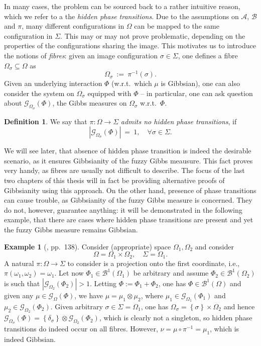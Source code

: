 \documentclass[12pt]{article}
\newcommand{\A}{\mathcal{A}}
\newcommand{\B}{\mathcal{B}}
\newcommand{\BB}{\mathscr{B}}
\newcommand{\G}{\mathcal{G}}
\newcommand{\set}[1]{\left\{#1\right\}}
\newcommand{\ra}{\rightarrow}
\newcommand{\1}{\mathbbm{1}}
\newcommand{\5}{\vspace{0.5cm}}
\theoremstyle{definition}
\newtheorem{ex}[thm]{Example}
\newtheorem{df}[thm]{Definition}
\begin{document}
In many cases, the problem can be sourced back to a rather intuitive reason, which we refer to a the \textit{hidden phase transitions}. Due to the assumptions on $\A$, $\B$ and $\pi$, many different configurations in $\Omega$ can be mapped to the same configuration in $\Sigma$. This may or may not prove problematic, depending on the properties of the configurations sharing the image. This motivates us to introduce the notions of \textit{fibres}: given an image configuration $\sigma\in\Sigma$, one defines a fibre $\Omega_\sigma\subseteq\Omega$ as
$$\Omega_\sigma ~:=~ \pi^{-1}(\sigma).$$
Given an underlying interaction $\Phi$ (w.r.t.~which $\mu$ is Gibbsian), one can also consider the system on $\Omega_\sigma$ equipped with $\Phi$ -- in particular, one can ask question about $\G_{\Omega_\sigma}(\Phi)$, the Gibbs measures on $\Omega_\sigma$ w.r.t.~$\Phi$. 
\begin{df}
We say that $\pi:\Omega\ra\Sigma$ \textit{admits no hidden phase transitions}, if 
$$|\G_{\Omega_\sigma}(\Phi)| ~=~ 1, \quad \forall \sigma\in\Sigma.$$
\end{df}
We will see later, that absence of hidden phase transition is indeed the desirable scenario, as it ensures Gibbsianity of the fuzzy Gibbs meausure. This fact proves very handy, as fibres are usually not difficult to describe. The focus of the last two chapters of this thesis will in fact be providing alternative proofs of Gibbsianity using this approach. On the other hand, presence of phase transitions can cause trouble, as Gibbsianity of the fuzzy Gibbs measure is concerned. They do not, however, guarantee anything: it will be demonstrated in the following example, that there are cases where hidden phase transitions are present and yet the fuzzy Gibbs measure remains Gibbsian.

\begin{ex}[\cite{Ber}, pp.~138]
Consider (appropriate) space $\Omega_1,\Omega_2$ and consider
$$\Omega=\Omega_1\times\Omega_2,\quad\Sigma=\Omega_1.$$
A natural $\pi:\Omega\ra\Sigma$ to consider is a projection onto the first coordinate, i.e., $\pi(\omega_1,\omega_2)=\omega_1$. Let now $\Phi_1\in\BB^1(\Omega_1)$ be arbitrary and assume $\Phi_2\in\BB^1(\Omega_2)$ is such that $|\G_{\Omega_2}(\Phi_2)|>1$. Letting $\Phi:=\Phi_1+\Phi_2$, one has $\Phi\in\BB^1(\Omega)$ and given any $\mu\in\G_{\Omega}(\Phi)$, we have $\mu=\mu_1\otimes\mu_2$, where $\mu_1\in\G_{\Omega_1}(\Phi_1)$ and $\mu_2\in\G_{\Omega_2}(\Phi_2)$. Given arbitrary $\sigma\in\Sigma=\Omega_1$, one has $\Omega_\sigma=\set{\sigma}\times\Omega_2$ and hence $\G_{\Omega_\sigma}(\Phi)=\set{\delta_\sigma}\otimes\G_{\Omega_2}(\Phi_2)$, which is clearly not a singleton, so hidden phase transitions do indeed occur on all fibres. However, $\nu=\mu\circ\pi^{-1}=\mu_1$, which is indeed Gibbsian.
\end{ex}
\end{document}
